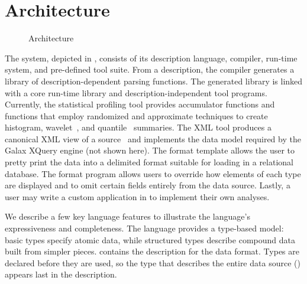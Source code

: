 \section{Architecture}
\label{section:pads}


\begin{figure}
  \begin{center}
  \end{center}
\caption{\label{figure:arch}\pads{} Architecture}
\end{figure}

The \pads{} system, depicted in , consists of its
description language, compiler, run-time system, and pre-defined tool
suite.  From a description, the compiler generates a library of
description-dependent parsing functions.  The generated library is
linked with a core run-time library and description-independent tool
programs.  Currently, the statistical profiling tool provides
accumulator functions and functions that employ randomized and
approximate techniques to create histogram, %
wavelet~\cite{histograms-wavelets}, and quantile~\cite{quantiles}
summaries.  The XML tool produces a canonical XML view
of a \pads{} source~\cite{fernandez+:padx} and implements the data
model required by the Galax XQuery engine (not shown here).
The format template allows the user to pretty print the data into a  
delimited format suitable for loading in a relational database.   
  The format program allows users to override how  
elements of each type are displayed and to omit certain fields  
entirely from the data source.
Lastly, a user may write a custom
application in \C{} to implement their own analyses.

We describe a few key language features to illustrate the language's
expressiveness and completeness.  The language provides a type-based
model: basic types specify atomic data, while structured types
describe compound data built from simpler pieces.
 contains the \pads{} description for the
\dibbler{} data format.  Types are declared
before they are used, so the type that describes the entire data
source () appears last in the description.

